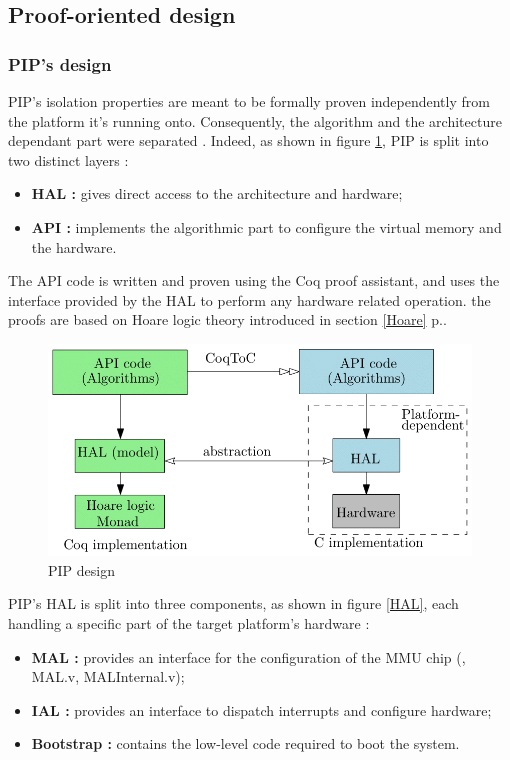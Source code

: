 \subsection{Proof-oriented design}

\subsubsection{PIP's design} 
PIP's isolation properties are meant to be formally proven independently from the platform it's running onto. Consequently, the algorithm and the architecture dependant part were separated \cite{PIPKernel}. Indeed, as shown in figure \ref{design}, PIP is split into two distinct layers  :
\begin{itemize}
	\item \textbf{HAL :} gives direct access to the architecture and hardware;
	\item \textbf{API :} implements the algorithmic part to configure the virtual memory and the hardware.
\end{itemize}

\noindent The API code is written and proven using the Coq proof assistant, and uses the interface provided by the HAL to perform any hardware related operation. the proofs are based on Hoare logic theory introduced in section \ref{Hoare} p.\pageref{Hoare}.

\begin{figure}[!ht]  
	\centering 
	\includegraphics[width=0.8\linewidth, frame]{img/PIPDesign.png} 
	\caption[PIP design]{PIP design \cite{PIPKernel}}
	\label{design}
\end{figure}

\noindent PIP's HAL is split into three components, as shown in figure \ref{HAL}, each handling a specific part of the target platform's hardware :
\begin{itemize}
	\item \textbf{\gls{MAL} :} provides an interface for the configuration of the MMU chip (\cite{PIP}, MAL.v, MALInternal.v);
	\item \textbf{\gls{IAL} :} provides an interface to dispatch interrupts and configure hardware;
	\item \textbf{Bootstrap :} contains the low-level code required to boot the system.
\end{itemize}

